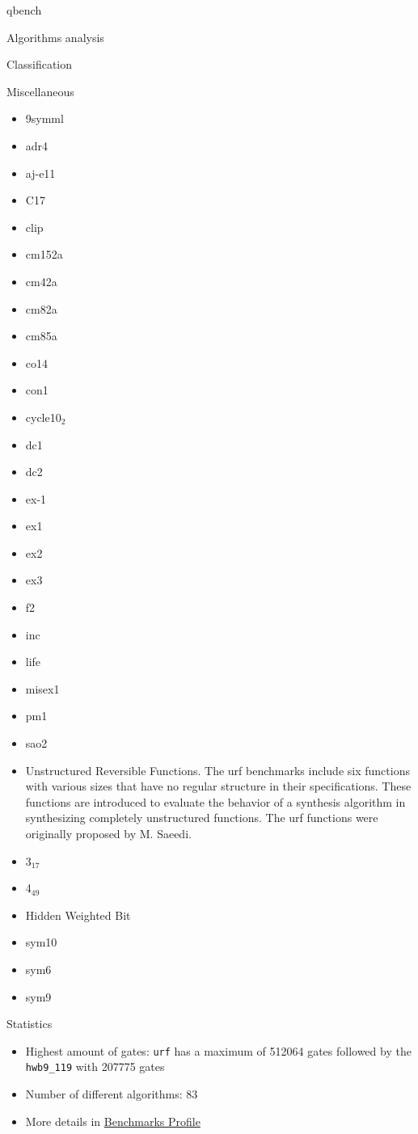 \documentclass[11pt]{beamer}
\begin{document}
\begin{frame}[fragile,label={sec:org639c711}]{qbench}
\begin{block}{Algorithms analysis}
\begin{block}{Classification}
\begin{block}{Miscellaneous}
\begin{itemize}
\item 9symml
\item adr4
\item aj-e11
\item C17
\item clip
\item cm152a
\item cm42a
\item cm82a
\item cm85a
\item co14
\item con1
\item cycle10\(_{\text{2}}\)
\item dc1
\item dc2
\item ex-1
\item ex1
\item ex2
\item ex3
\item f2
\item inc
\item life
\item misex1
\item pm1
\item sao2
\item Unstructured Reversible Functions. The urf benchmarks include six functions with various sizes that have no regular structure in their specifications. These functions are introduced to evaluate the behavior of a synthesis algorithm in synthesizing completely unstructured functions. The urf functions were originally proposed by M. Saeedi.
\item 3\(_{\text{17}}\)
\item 4\(_{\text{49}}\)
\item Hidden Weighted Bit
\item sym10
\item sym6
\item sym9
\end{itemize}
\end{block}
\end{block}


\begin{block}{Statistics}
\begin{itemize}
\item Highest amount of gates: \texttt{urf} has a maximum of 512064 gates followed by the \texttt{hwb9\_119} with 207775 gates
\item Number of different algorithms: 83
\item More details in \href{benchmarks\_profile/README.org}{Benchmarks Profile}
\end{itemize}
\end{block}
\end{block}


\end{frame}
\end{document}
